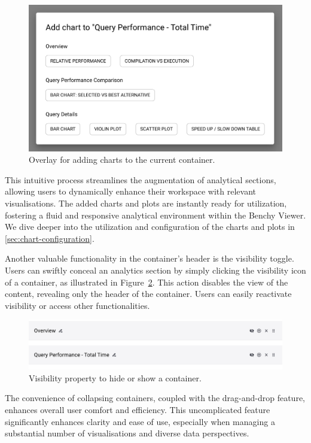 \begin{figure}[h]
  \centering
  \includegraphics[width=0.6\linewidth]{figures/analytics-add-chart.png}
  \caption{Overlay for adding charts to the current container.}
  \label{fig:analytics-add-chart}
\end{figure}

This intuitive process streamlines the augmentation of analytical sections, allowing users to dynamically enhance their workspace with relevant visualisations. The added charts and plots are instantly ready for utilization, fostering a fluid and responsive analytical environment within the Benchy Viewer.\\
We dive deeper into the utilization and configuration of the charts and plots in \ref{sec:chart-configuration}.


Another valuable functionality in the container's header is the visibility toggle. Users can swiftly conceal an analytics section by simply clicking the visibility icon of a container, as illustrated in Figure~\ref{fig:analytics-section-visibility}. This action disables the view of the content, revealing only the header of the container. Users can easily reactivate visibility or access other functionalities.

\begin{figure}[h]
  \centering
  \includegraphics[width=0.8\linewidth]{figures/analytics-section-visibility.png}
  \caption{Visibility property to hide or show a container.}
  \label{fig:analytics-section-visibility}
\end{figure}

The convenience of collapsing containers, coupled with the drag-and-drop feature, enhances overall user comfort and efficiency. This uncomplicated feature significantly enhances clarity and ease of use, especially when managing a substantial number of visualisations and diverse data perspectives.

